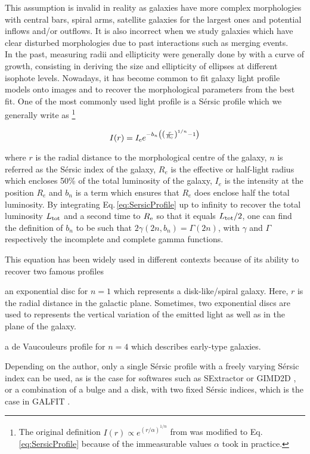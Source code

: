 This assumption is invalid in reality as galaxies have more complex morphologies with central bars, spiral arms, satellite galaxies for the largest ones and potential inflows and/or outflows. It is also incorrect when we study galaxies which have clear disturbed morphologies due to past interactions such as merging events.  \\

In the past, measuring radii and ellipticity were generally done by with a curve of growth, consisting in deriving the size and ellipticity of ellipses at different isophote levels. Nowadays, it has become common to fit galaxy light profile models onto images and to recover the morphological parameters from the best fit. One of the most commonly used light profile is a Sérsic profile which we generally write as \footnote{The original definition $I(r) \propto e^{(r/\alpha)^{1/n}}$ from  was modified to Eq.\,\ref{eq:SersicProfile} because of the immeasurable values $\alpha$ took in practice.} 

\begin{equation}
    \label{eq:SersicProfile}
    I(r) = I_{\rm{e}} e^{ - b_n \left ( \left  ( \frac{r}{R_{\rm{e}}}  \right )^{1/n} - 1 \right ) }
\end{equation}

where $r$ is the radial distance to the morphological centre of the galaxy, $n$ is referred as the Sérsic index of the galaxy, $R_e$ is the effective or half-light radius which encloses 50\% of the total luminosity of the galaxy, $I_e$ is the intensity at the position $R_e$ and $b_n$ is a term which ensures that $R_e$ does enclose half the total luminosity. By integrating Eq.\,\ref{eq:SersicProfile} up to infinity to recover the total luminosity $L_{\rm{tot}}$ and a second time to $R_{\rm{e}}$ so that it equals $L_{\rm{tot}}/2$, one can find the definition of $b_n$ to be such that $2 \gamma (2n, b_n) = \Gamma (2n)$, with $\gamma$ and $\Gamma$ respectively the incomplete and complete gamma functions.

This equation has been widely used in different contexts because of its ability to recover two famous profiles
\begin{enumerate*}[label={(\alph*)}]
    \item an exponential disc for $n = 1$ which represents a disk-like/spiral galaxy. Here, $r$ is the radial distance in the galactic plane. Sometimes, two exponential discs are used to represents the vertical variation of the emitted light as well as in the plane of the galaxy. 
    \item a de Vaucouleurs profile for $n = 4$ which describes early-type galaxies.
\end{enumerate*}
Depending on the author, only a single Sérsic profile with a freely varying Sérsic index can be used, as is the case for softwares such as SExtractor  or GIMD2D , or a combination of a bulge and a disk, with two fixed Sérsic indices, which is the case in GALFIT . \\

